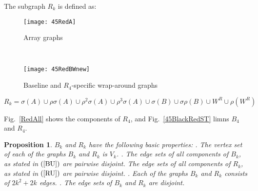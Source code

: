 \documentclass[12pt,journal,compsoc,onecolumn,]{IEEEtran}
\newtheorem{proposition}[theorem]{Proposition}
\begin{document}
{\bigskip The subgraph $R_{k}$ is defined as: \begin{figure*}[t!]
    \centering
    \begin{subfigure}[b]{0.5\textwidth}
        \centering
        \texttt{[image: 45RedA]}
        \caption{Array graphs}
    \end{subfigure}~
    \begin{subfigure}[b]{0.5\textwidth}
        \centering
        \texttt{[image: 45RedBWnew]}
        \caption{Baseline and $R_4$-specific wrap-around graphs}
    \end{subfigure}
    \caption{$R_4$ components ($k=4$)}
    \label{RedAll}
\end{figure*} \begin{equation}
R_{k}=\sigma\left(  A\right)  \cup\rho\sigma\left(  A\right)  \cup\rho
^{2}\sigma\left(  A\right)  \cup\rho^{3}\sigma\left(  A\right)  \cup
\sigma\left(  B\right)  \cup\sigma\rho\left(  B\right)  \cup W^{R}\cup
\rho\left(  W^{R}\right)  \label{RU}\end{equation}


\bigskip Fig.~\ref{RedAll} shows the components of $R_{4}$, and Fig.~\ref{45BlackRedST} limns $B_4$ and $R_4$.

\bigskip
\begin{proposition}
\label{BasicRB} $B_{k}$ and $R_{k}$ have the following basic properties:
. The vertex set of each of the graphs $B_{k}$ and $R_{k}$ is $V_{k}$.
. The edge sets of all components of $B_{k}$, as stated in
$(\ref{BU})$ are pairwise disjoint. The edge sets of all components of $R_{k}$,
as stated in $(\ref{RU})$ are pairwise disjoint.
. Each of the graphs $B_{k}$ and $R_{k}$ consists of $2k^{2}+2k$ edges.
. The edge sets of $B_{k}$ and $R_{k}$ are disjoint.
\end{proposition}

}
\end{document}
